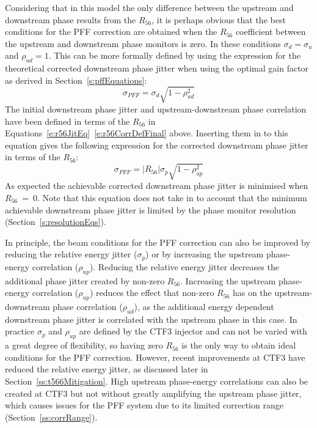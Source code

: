 Considering that in this model the only difference between the upstream and downstream phase results from the \(R_{56}\), it is perhaps obvious that the best conditions for the PFF correction are obtained when the \(R_{56}\) coefficient between the upstream and downstream phase monitors is zero. In these conditions \(\sigma_d = \sigma_u\) and \(\rho_{ud} = 1\). This can be more formally defined by using the expression for the theoretical corrected downstream phase jitter when using the optimal gain factor as derived in Section~\ref{s:pffEquations}:
\begin{equation}
\sigma_{PFF} = \sigma_d\sqrt{1-\rho_{ud}^2}
\end{equation}
The initial downstream phase jitter and upstream-downstream phase correlation have been defined in terms of the \(R_{56}\) in Equations~\ref{e:r56JitEq}~\ref{e:r56CorrDefFinal} above. Inserting them in to this equation gives the following expression for the corrected downstream phase jitter in terms of the \(R_{56}\):
\begin{equation}
\sigma_{PFF} = \left|R_{56}\right|\sigma_p\sqrt{1-\rho_{up}^2}
\label{e:r56PFFJit}
\end{equation}
As expected the achievable corrected downstream phase jitter is minimised when \(R_{56}~=~0\). Note that this equation does not take in to account that the minimum achievable downstream phase jitter is limited by the phase monitor resolution (Section~\ref{s:resolutionEqs}).

In principle, the beam conditions for the PFF correction can also be improved by reducing the relative energy jitter (\(\sigma_p\)) or by increasing the upstream phase-energy correlation (\(\rho_{up}\)). Reducing the relative energy jitter decreases the additional phase jitter created by non-zero \(R_{56}\). Increasing the upstream phase-energy correlation (\(\rho_{up}\)) reduces the effect that non-zero \(R_{56}\) has on the upstream-downstream phase correlation (\(\rho_{ud}\)), as the additional energy dependent downstream phase jitter is correlated with the upstream phase in this case. 
In practice \(\sigma_p\) and \(\rho_{up}\) are defined by the CTF3 injector and can not be varied with a great degree of flexibility, so having zero \(R_{56}\) is the only way to obtain ideal conditions for the PFF correction. However, recent improvements at CTF3 have reduced the relative energy jitter, as discussed later in Section~\ref{ss:t566Mitigation}. High upstream phase-energy correlations can also be created at CTF3 but not without greatly amplifying the upstream phase jitter, which causes issues for the PFF system due to its limited correction range (Section~\ref{ss:corrRange}).

